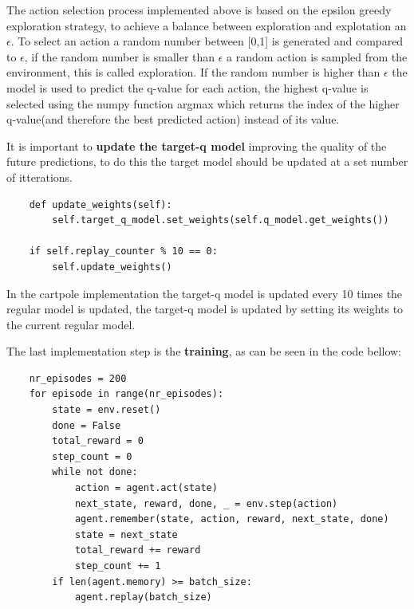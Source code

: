 The action selection process implemented above is based on the epsilon greedy exploration strategy, to achieve a balance between exploration and explotation an $\epsilon$. To select an action a random number between [0,1] is generated and compared to $\epsilon$, if the random number is smaller than $\epsilon$ a random action is sampled from the environment, this is called exploration. If the random number is higher than $\epsilon$ the model is used to predict the q-value for each action, the highest q-value is selected using the numpy function argmax which returns the index of the higher q-value(and therefore the best predicted action) instead of its value.

It is important to \textbf{update the target-q model} improving the quality of the future predictions, to do this the target model should be updated at a set number of itterations.

\lstset{language=Python}
\lstset{frame=lines}
\lstset{basicstyle=\footnotesize}
\begin{lstlisting}
    def update_weights(self):
        self.target_q_model.set_weights(self.q_model.get_weights())

    if self.replay_counter % 10 == 0:
        self.update_weights()
\end{lstlisting}

In the cartpole implementation the target-q model is updated every 10 times the regular model is updated,
the target-q model is updated by setting its weights to the current regular model.

The last implementation step is the \textbf{training}, as can be seen in the code bellow:

\lstset{language=Python}
\lstset{frame=lines}
\lstset{basicstyle=\footnotesize}
\begin{lstlisting}
    nr_episodes = 200
    for episode in range(nr_episodes):
        state = env.reset()
        done = False
        total_reward = 0
        step_count = 0
        while not done:
            action = agent.act(state)
            next_state, reward, done, _ = env.step(action)
            agent.remember(state, action, reward, next_state, done)
            state = next_state
            total_reward += reward
            step_count += 1
        if len(agent.memory) >= batch_size:
            agent.replay(batch_size)
\end{lstlisting}

